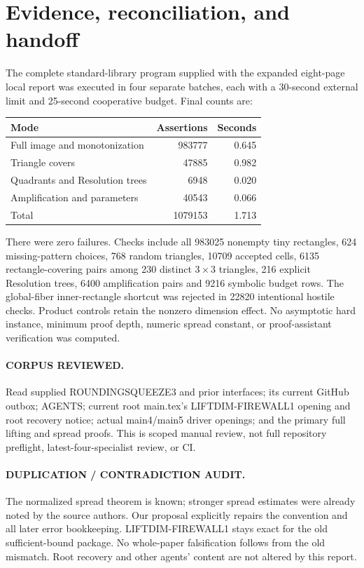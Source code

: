 \documentclass[11pt]{article}
\begin{document}
\section{Evidence, reconciliation, and handoff}
The complete standard-library program supplied with the expanded eight-page
local report was executed in four separate batches, each with a 30-second
external limit and 25-second cooperative budget. Final counts are:
\begin{center}
\begin{tabular}{lrr}\toprule
Mode & Assertions & Seconds\\\midrule
Full image and monotonization &983777&0.645\\
Triangle covers &47885&0.982\\
Quadrants and Resolution trees &6948&0.020\\
Amplification and parameters &40543&0.066\\\midrule
Total &1079153&1.713\\\bottomrule
\end{tabular}
\end{center}
There were zero failures. Checks include all 983025 nonempty tiny rectangles,
624 missing-pattern choices, 768 random triangles, 10709 accepted cells,
6135 rectangle-covering pairs among 230 distinct $3\times3$ triangles,
216 explicit Resolution trees, 6400 amplification pairs and 9216 symbolic
budget rows. The global-fiber inner-rectangle shortcut was rejected in
22820 intentional hostile checks. Product controls retain the nonzero
dimension effect. No asymptotic hard instance, minimum proof depth, numeric
spread constant, or proof-assistant verification was computed.

\paragraph{CORPUS REVIEWED.}
Read supplied ROUNDINGSQUEEZE3 and prior interfaces; its current GitHub
outbox; AGENTS; current root main.tex's LIFTDIM-FIREWALL1 opening and root
recovery notice; actual main4/main5 driver openings; and the primary
full lifting and spread proofs. This is scoped manual review, not full
repository preflight, latest-four-specialist review, or CI.

\paragraph{DUPLICATION / CONTRADICTION AUDIT.}
The normalized spread theorem is known; stronger spread estimates were
already noted by the source authors. Our proposal explicitly repairs the
convention and all later error bookkeeping. LIFTDIM-FIREWALL1 stays exact
for the old sufficient-bound package. No whole-paper falsification follows
from the old mismatch. Root recovery and other agents' content are not
altered by this report.
\end{document}

